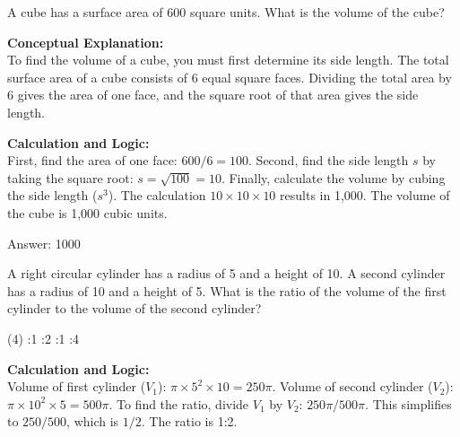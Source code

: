 \documentclass[11pt,paper=a4,answers]{exam}
\begin{document}
\begin{questions}
\vspace{60pt}

\question
A cube has a surface area of 600 square units. What is the volume of the cube?

\begin{solution}
\textbf{Conceptual Explanation:} \\
To find the volume of a cube, you must first determine its side length. The total surface area of a cube consists of 6 equal square faces. Dividing the total area by 6 gives the area of one face, and the square root of that area gives the side length.

\vspace{30pt}

\textbf{Calculation and Logic:} \\
First, find the area of one face: $600 / 6 = 100$. Second, find the side length $s$ by taking the square root: $s = \sqrt{100} = 10$. Finally, calculate the volume by cubing the side length ($s^3$). The calculation $10 \times 10 \times 10$ results in 1,000. The volume of the cube is 1,000 cubic units.

\vspace{30pt}

Answer: \colorbox{yellow!100}{1000}
\end{solution}

\vspace{60pt}

\question
A right circular cylinder has a radius of 5 and a height of 10. A second cylinder has a radius of 10 and a height of 5. What is the ratio of the volume of the first cylinder to the volume of the second cylinder?
\begin{tasks}(4)
    :1
    :2
    :1
    :4
\end{tasks}

\begin{solution}
\textbf{Calculation and Logic:} \\
Volume of first cylinder ($V_1$): $\pi \times 5^2 \times 10 = 250\pi$. Volume of second cylinder ($V_2$): $\pi \times 10^2 \times 5 = 500\pi$. To find the ratio, divide $V_1$ by $V_2$: $250\pi / 500\pi$. This simplifies to $250/500$, which is $1/2$. The ratio is 1:2.

\vspace{30pt}


\end{solution}
\end{questions}
\end{document}
